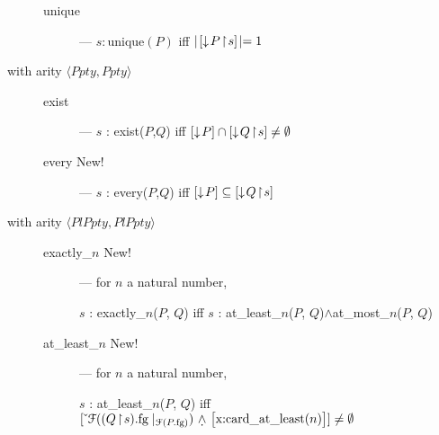 \begin{description}
\begin{description}
    \item[\textnormal{unique}] --- $s:\textrm{unique}(P)$ iff
      $\mid\![\downarrow\!P\!\restriction\!s]\!\mid = 1$

    \end{description}

    \item[with arity \textnormal{$\langle\textit{Ppty},\textit{Ppty}\rangle$}] \mbox{}

  \begin{description}
    
  \item[\textnormal{exist}] ---  $s$ : exist($P$,$Q$) iff
     $[\downarrow\!P]\cap[\downarrow\!Q\!\restriction\! s]\not=\emptyset$
    
  \item[\textnormal{every} New!] --- $s$ : every($P$,$Q$) iff
    $[\downarrow\!P]\subseteq[\downarrow\!Q\!\restriction\!s]$

  \end{description}

  
\item[with arity
  \textnormal{$\langle\textit{PlPpty},\textit{PlPpty}\rangle$}] \mbox{}
  
\begin{description}
    
\item[\textnormal{exactly\_$n$} New!] --- for $n$ a natural number,

  $s$ : exactly\_$n$($P$, $Q$) iff $s$ : at\_least\_$n$($P$, $Q$)$\wedge$at\_most\_$n$($P$, $Q$)


      
    \item[\textnormal{at\_least\_$n$} New!] --- for $n$ a natural
      number,

      $s$ : at\_least\_$n$($P$, $Q$) iff
          $\down{\mathcal{F}((Q\!\restriction\!        s).\text{fg}\mid_{\mathcal{F}(P.\text{fg})})
        \text{ \d{$\wedge$} \smallrecord{\smalltfield{x}{card\_at\_least($n$)}}}}
      \not=\emptyset$



\end{description}
\end{description}
